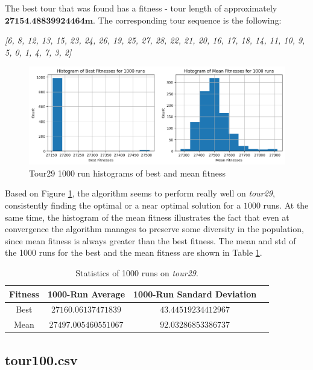 \documentclass[a4paper,10pt]{article}
\begin{document}
The best tour that was found has a fitness - tour length of approximately $\textbf{27154.48839924464m}$. The corresponding tour sequence is the following:
\begin{center}
\textit{[6, 8, 12, 13, 15, 23, 24, 26, 19, 25, 27, 28, 22, 21, 20, 16, 17, 18, 14, 11, 10, 9, 5, 0, 1, 4, 7, 3, 2]}
\end{center}

\begin{figure}[H]
     \centering
     \includegraphics[width=\textwidth]{results/4.2/tour29_histogram.png}
     \caption{Tour29 1000 run histograms of best and mean fitness}
     \label{fig:tour29histogram}
\end{figure}

Based on Figure \ref{fig:tour29histogram}, the algorithm seems to perform really well on \textit{tour29}, consistently finding the optimal or a near optimal solution for a $1000$ runs. At the same time, the histogram of the mean fitness illustrates the fact that even at convergence the algorithm manages to preserve some diversity in the population, since mean fitness is always greater than the best fitness. The mean and std of the 1000 runs for the best and the mean fitness are shown in Table \ref{table:1000run_statistics}.

\begin{table}[H]
\centering
\begin{tabular}{ |c|c|c|c| } 
\hline
Fitness & 1000-Run Average & 1000-Run Sandard Deviation\\
\hline
Best & $27160.06137471839$ & $43.44519234412967$ \\ 
Mean & $27497.005460551067$ & $92.03286853386737$ \\ 
\hline
\end{tabular}
\caption{Statistics of 1000 runs on \textit{tour29}.}
\label{table:1000run_statistics}
\end{table}


\subsection{tour100.csv} \label{ss:tour100}
\end{document}
